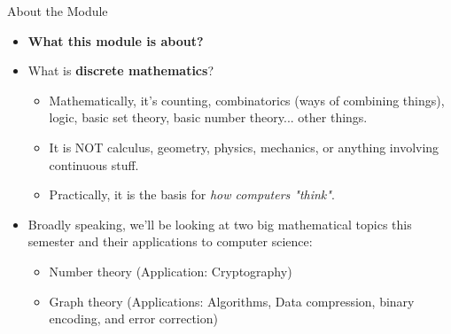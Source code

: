 \documentclass[11pt,aspectratio=1610]{beamer}
\begin{document}
		\begin{frame}{About the Module}
			
			\begin{itemize}
				\item \textbf{What this module is about?} \p
			\end{itemize}
			
			\begin{center}
				
				
		\end{center}
		\p	
		\begin{itemize}\itemsep7mm
			\item What is \textbf{discrete mathematics}? \p
			\begin{itemize}\itemsep3mm
				\item Mathematically, it's counting, combinatorics (ways of combining things), logic, basic set theory, basic number theory... other things. 
				
				\item It is NOT calculus, geometry, physics, mechanics, or anything involving continuous stuff. 
				
				\item Practically, it is the basis for \emph{how computers "think"}.
			\end{itemize}
			\item Broadly speaking, we'll be looking at two big mathematical topics this semester and their applications to computer science:
			\begin{itemize}\itemsep3mm
				\item Number theory (Application: Cryptography)
				\item Graph theory (Applications: Algorithms, Data compression, binary encoding, and error correction)
			\end{itemize}
		\end{itemize}
	\end{frame}
	
	
	
	
	
\end{document}
